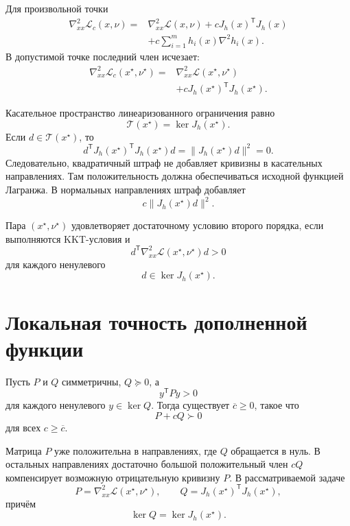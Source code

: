 Для произвольной точки
\[
\begin{aligned}
    \nabla_{xx}^2\mathcal L_c(x,\nu)
    ={}&
    \nabla_{xx}^2\mathcal L(x,\nu)
    +
    cJ_h(x)^{\mathsf T}J_h(x)
    \\
    &+
    c\sum_{i=1}^{m}h_i(x)\nabla^2h_i(x).
\end{aligned}
\]
В допустимой точке последний член исчезает:
\[
\begin{aligned}
    \nabla_{xx}^2
    \mathcal L_c(x^\star,\nu^\star)
    ={}&
    \nabla_{xx}^2
    \mathcal L(x^\star,\nu^\star)
    \\
    &+
    cJ_h(x^\star)^{\mathsf T}J_h(x^\star).
\end{aligned}
\]

Касательное пространство линеаризованного ограничения равно
\[
    \mathcal T(x^\star)
    =
    \ker J_h(x^\star).
\]
Если \(d\in\mathcal T(x^\star)\), то
\[
    d^{\mathsf T}
    J_h(x^\star)^{\mathsf T}J_h(x^\star)d
    =
    \lVert J_h(x^\star)d\rVert^2
    =
    0.
\]
Следовательно, квадратичный штраф не добавляет кривизны в касательных
направлениях. Там положительность должна обеспечиваться исходной
функцией Лагранжа. В нормальных направлениях штраф добавляет
\[
    c\lVert J_h(x^\star)d\rVert^2.
\]

\begin{definition}
Пара \((x^\star,\nu^\star)\) удовлетворяет достаточному условию
второго порядка, если выполняются KKT-условия и
\[
    d^{\mathsf T}
    \nabla_{xx}^2\mathcal L(x^\star,\nu^\star)d
    >0
\]
для каждого ненулевого
\[
    d\in\ker J_h(x^\star).
\]
\end{definition}

\section{Локальная точность дополненной функции}

\begin{lemma}
Пусть \(P\) и \(Q\) симметричны, \(Q\succeq0\), а
\[
    y^{\mathsf T}Py>0
\]
для каждого ненулевого \(y\in\ker Q\). Тогда существует
\(\overline c\ge0\), такое что
\[
    P+cQ\succ0
\]
для всех \(c\ge\overline c\).
\end{lemma}

Матрица \(P\) уже положительна в направлениях, где \(Q\) обращается
в нуль. В остальных направлениях достаточно большой положительный
член \(cQ\) компенсирует возможную отрицательную кривизну \(P\). В
рассматриваемой задаче
\[
    P=
    \nabla_{xx}^2\mathcal L(x^\star,\nu^\star),
    \qquad
    Q=
    J_h(x^\star)^{\mathsf T}J_h(x^\star),
\]
причём
\[
    \ker Q=\ker J_h(x^\star).
\]

